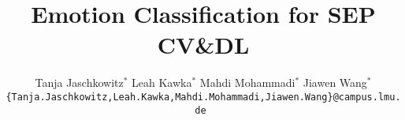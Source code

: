 \documentclass[10pt,twocolumn,letterpaper]{article}
\title{Emotion Classification for SEP CV\&DL}
\author{
Tanja Jaschkowitz$^{*}$
\quad
Leah Kawka$^{*}$
\quad
Mahdi Mohammadi$^{*}$
\quad
Jiawen Wang$^{*}$\\
\tt\small\{Tanja.Jaschkowitz,Leah.Kawka,Mahdi.Mohammadi,Jiawen.Wang\}@campus.lmu.de
}
\begin{document}
\maketitle
    

 
 

{
    \small
    
    
}

% 
\end{document}
